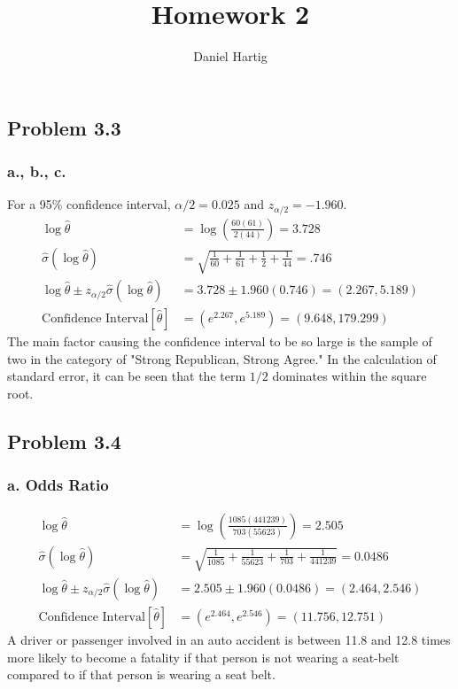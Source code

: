 \documentclass{article}
\title{Homework 2}
\author{Daniel Hartig}
\begin{document}
\maketitle

\titlespacing{\subsection}{0pt}{0pt}{0pt}
\titlespacing{\subsubsection}{0pt}{0pt}{-\parskip}

\subsection*{Problem 3.3}
\subsubsection*{a., b., c.}
For a 95\% confidence interval, $\alpha/2 = 0.025$ and $z_{\alpha/2} = -1.960$. 
\begin{align*}
\log\hat{\theta} &= \log\left(\frac{60(61)}{2(44)}\right) = 3.728 \\
\hat{\sigma}\left(\log\hat{\theta}\right) &= \sqrt{\frac{1}{60} + \frac{1}{61} + \frac{1}{2} + \frac{1}{44}} = .746\\ 
\log \hat{\theta} \pm z_{\alpha/2}\hat{\sigma}\left(\log\hat{\theta}\right) &=3.728 \pm 1.960(0.746) = (2.267,5.189)  \\
\text{Confidence Interval}[\hat{\theta}] &= (e^{2.267}, e^{5.189}) = (9.648, 179.299)
\end{align*}
The main factor causing the confidence interval to be so large is the sample of two in the category of "Strong Republican, Strong Agree." In the calculation of standard error, it can be seen that the term $1/2$ dominates within the square root.

\subsection*{Problem 3.4}
\subsubsection*{a. Odds Ratio}
\begin{align*}
\log \hat{\theta} &= \log\left(\frac{1085(441239)}{703(55623)}\right) = 2.505 \\
\hat{\sigma}\left(\log\hat{\theta}\right) &= \sqrt{\frac{1}{1085}+\frac{1}{55623}+\frac{1}{703}+\frac{1}{441239}} = 0.0486 \\
\log \hat{\theta} \pm z_{\alpha/2}\hat{\sigma}\left(\log\hat{\theta}\right) &= 2.505 \pm 1.960(0.0486) = (2.464, 2.546) \\
\text{Confidence Interval}[\hat{\theta}] &= (e^{2.464}, e^{2.546}) = (11.756, 12.751)
\end{align*}
A driver or passenger involved in an auto accident is between 11.8 and 12.8 times more likely to become a fatality if that person is not wearing a seat-belt compared to if that person is wearing a seat belt. 
\end{document}
